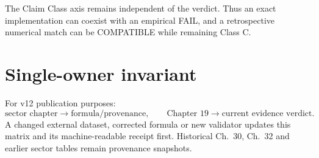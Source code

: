 The Claim Class axis remains independent of the verdict. Thus an exact implementation can coexist with an empirical FAIL, and a retrospective numerical match can be COMPATIBLE while remaining Class C.

\section{Single-owner invariant}

For v12 publication purposes:
\[
\boxed{
\text{sector chapter}\to\text{formula/provenance},
\qquad
\text{Chapter 19}\to\text{current evidence verdict}.
}
\]
A changed external dataset, corrected formula or new validator updates this matrix and its machine-readable receipt first. Historical Ch.~30, Ch.~32 and earlier sector tables remain provenance snapshots.
